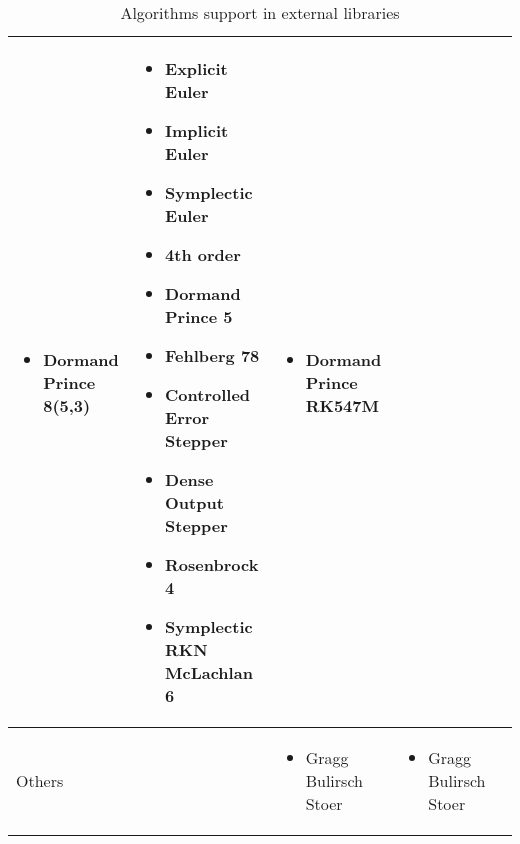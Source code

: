 \begin{sidewaystable}
\begin{adjustbox}{width=\columnwidth,center}
\begin{tabular}{p{} | p{} p{} p{} p{}}
\begin{itemize}[wide]
        \item Dormand Prince 8(5,3) 
        \end{itemize} & 
        \begin{itemize}[wide]
        \item Explicit Euler
        \item Implicit Euler
        \item Symplectic Euler
        \item 4th order
        \item Dormand Prince 5
        \item Fehlberg 78
        \item Controlled Error Stepper
        \item Dense Output Stepper
        \item Rosenbrock 4
        \item Symplectic RKN McLachlan 6
        \end{itemize} & 
        \begin{itemize}[wide]
        \item Dormand Prince RK547M
        \end{itemize} \\ \hline
    Others && 
        \begin{itemize}[wide]
        \item Gragg Bulirsch Stoer 
        \end{itemize} & 
        \begin{itemize}[wide]
        \item Gragg Bulirsch Stoer 
        \end{itemize} &\\
    \bottomrule	
\end{tabular}
\end{adjustbox}
\caption{Algorithms support in external libraries}	
\label{tab_algoexlib}
\end{sidewaystable}


